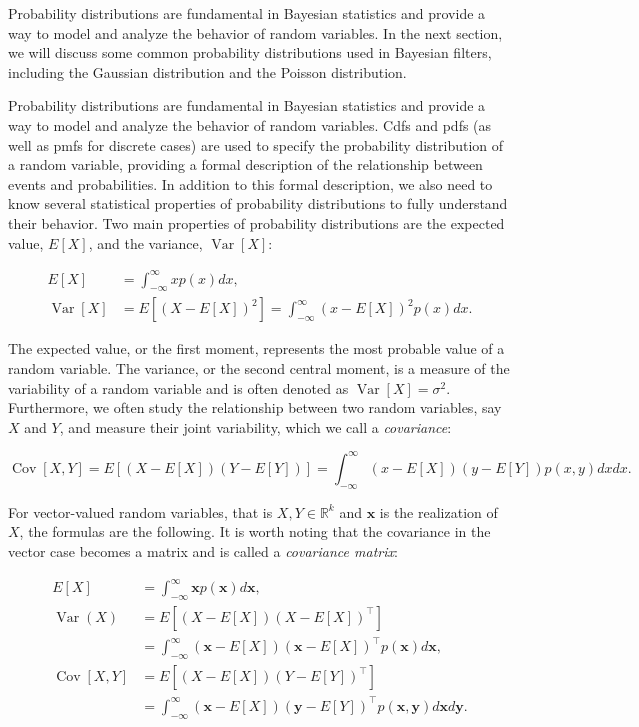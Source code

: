 Probability distributions are fundamental in Bayesian statistics and provide a way
to model and analyze the behavior of random variables. In the next section,
we will discuss some common probability distributions used in Bayesian filters,
including the Gaussian distribution and the Poisson distribution.

Probability distributions are fundamental in Bayesian statistics and provide a way
to model and analyze the behavior of random variables. Cdfs and pdfs (as well as pmfs
for discrete cases) are used to specify the probability distribution of a random
variable, providing a formal description of the relationship
between events and probabilities. In addition to this formal description, we also
need to know several statistical properties of probability distributions to fully
understand their behavior. Two main properties of probability distributions are
the expected value, $E[X]$, and the variance, $\operatorname{Var}[X]$:

$$
\begin{aligned}
E[X]&=\int_{-\infty}^{\infty} x p(x) d x, \\
\operatorname{Var}[X]
    &= E\left[(X-E[X])^2\right]
    =\int_{-\infty}^{\infty}(x-E[X])^2 p(x) d x.
\end{aligned}
$$

The expected value, or the first moment, represents the most probable value of
a random variable. The variance, or the second central moment, is a measure of the
variability of a random variable and is often denoted as $\operatorname{Var}[X] = \sigma^2$.
Furthermore, we often study the relationship between two random variables, say $X$ and
$Y$, and measure their joint variability, which we call a \textit{covariance}:

$$
\operatorname{Cov}[X, Y]
    = E\left[(X-E[X])(Y-E[Y])\right]
    =\int_{-\infty}^{\infty}(x-E[X])(y-E[Y]) p(x, y) d x d x.
$$

For vector-valued random variables, that is $X, Y \in \mathbb{R}^k$ and $\mathbf{x}$
is the realization of $X$, the formulas are the following. It is worth noting that
the covariance in the vector case becomes a matrix and is called a \textit{covariance
matrix}:

$$
\begin{aligned}
E[X]
    &=\int_{-\infty}^{\infty} \mathbf{x} p(\mathbf{x}) d \mathbf{x}, \\
\operatorname{Var}(X)
    &= E\left[\left(X-E[X]\right)\left(X-E[X]\right)^\intercal\right]
    \\&=\int_{-\infty}^{\infty}
        \left(\mathbf{x}-E[X]\right)
        \left(\mathbf{x}-E[X]\right)^\intercal
        p(\mathbf{x})
        d \mathbf{x}, \\
\operatorname{Cov}[X, Y]
    &= E\left[\left(X-E[X]\right)\left(Y-E[Y]\right)^\intercal\right]
    \\&=\int_{-\infty}^{\infty}
        \left(\mathbf{x}-E[X]\right)
        \left(\mathbf{y}-E[Y]\right)^\intercal
        p(\mathbf{x}, \mathbf{y})
        d \mathbf{x} d \mathbf{y}.
\end{aligned}
$$

